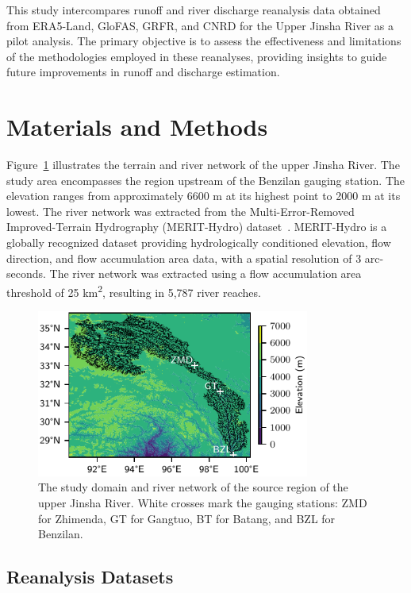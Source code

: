 \documentclass[water,article,submit,pdftex,moreauthors]{Definitions/mdpi}
\begin{document}
This study intercompares runoff and river discharge reanalysis data obtained from ERA5-Land, GloFAS, GRFR, and CNRD for the Upper Jinsha River as a pilot analysis. The primary objective is to assess the effectiveness and limitations of the methodologies employed in these reanalyses, providing insights to guide future improvements in runoff and discharge estimation.

\section{Materials and Methods}

Figure~\ref{fig:domain} illustrates the terrain and river network of the upper Jinsha River. The study area encompasses the region upstream of the Benzilan gauging station. The elevation ranges from approximately 6600 m at its highest point to 2000 m at its lowest. The river network was extracted from the Multi-Error-Removed Improved-Terrain Hydrography (MERIT-Hydro) dataset~\citep{yamazaki2019WRR, yamazaki2017GRL}. MERIT-Hydro is a globally recognized dataset providing hydrologically conditioned elevation, flow direction, and flow accumulation area data, with a spatial resolution of 3 arc-seconds. The river network was extracted using a flow accumulation area threshold of 25 km\textsuperscript{2}, resulting in 5,787 river reaches.

\begin{figure}[H]
  \includegraphics[width=0.8\textwidth]{domain.pdf}
  \caption{The study domain and river network of the source region of the upper Jinsha River. White crosses mark the gauging stations: ZMD for Zhimenda, GT for Gangtuo, BT for Batang, and BZL for Benzilan.\label{fig:domain}}

\end{figure}

\subsection{Reanalysis Datasets}
\end{document}
